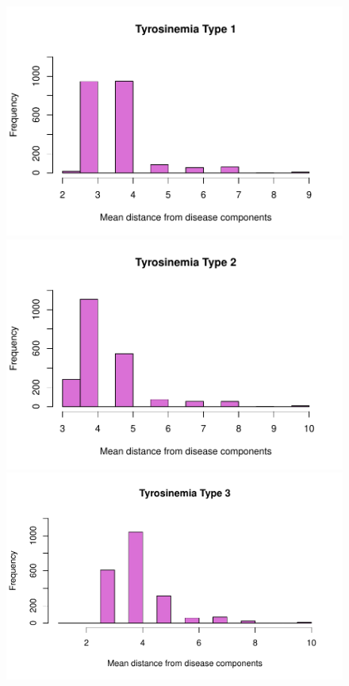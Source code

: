 \begin{figure}[h!]
    \includegraphics[scale=0.2]{Images/Tyrosinemia Type I.pdf}
    \includegraphics[scale=0.2]{Images/Tyrosinemia Type II.pdf}
    \includegraphics[scale=0.2]{Images/Tyrosinemia Type III.pdf}

\end{figure}
